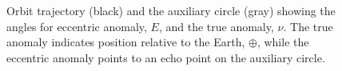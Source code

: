 \begin{figure}[htbp]
   \caption{Orbit trajectory (black) and the auxiliary circle (gray) showing the angles for eccentric anomaly, $E$, and the true anomaly, $\nu$. The true anomaly indicates position relative to the Earth, $\oplus$, while the eccentric anomaly points to an echo point on the auxiliary circle.}
   \label{fig:geometry}
\end{figure}
